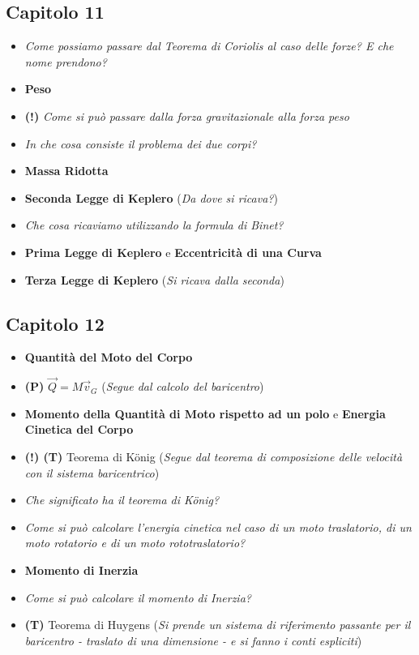 \documentclass[11pt,a4paper,twoside]{article}
\begin{document}
\subsection*{Capitolo 11}

\begin{itemize}
	\item \textit{Come possiamo passare dal Teorema di Coriolis al caso delle forze? E che nome prendono?}
	\item \textbf{Peso}
	\item \textbf{(!)} \textit{Come si può passare dalla forza gravitazionale alla forza peso}
	\item \textit{In che cosa consiste il problema dei due corpi?}
	\item \textbf{Massa Ridotta}
	\item \textbf{Seconda Legge di Keplero} (\textit{Da dove si ricava?})
	\item \textit{Che cosa ricaviamo utilizzando la formula di Binet?}
	\item \textbf{Prima Legge di Keplero} e \textbf{Eccentricità di una Curva}
	\item \textbf{Terza Legge di Keplero} (\textit{Si ricava dalla seconda})
\end{itemize}

\subsection*{Capitolo 12}

\begin{itemize}
	\item \textbf{Quantità del Moto del Corpo}
	\item \textbf{(P)} $\vec Q = M\vec v_G$ (\textit{Segue dal calcolo del baricentro})
	\item \textbf{Momento della Quantità di Moto rispetto ad un polo} e \textbf{Energia Cinetica del Corpo}
	\item \textbf{(!) (T)} Teorema di König (\textit{Segue dal teorema di composizione delle velocità con il sistema baricentrico})
	\item \textit{Che significato ha il teorema di König?}
	\item \textit{Come si può calcolare l'energia cinetica nel caso di un moto traslatorio, di un moto rotatorio e di un moto rototraslatorio?}
	\item \textbf{Momento di Inerzia}
	\item \textit{Come si può calcolare il momento di Inerzia?}
	\item \textbf{(T)} Teorema di Huygens (\textit{Si prende un sistema di riferimento passante per il baricentro - traslato di una dimensione - e si fanno i conti espliciti})
\end{itemize}
\end{document}
